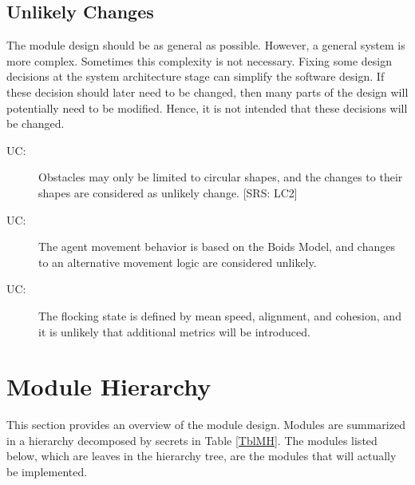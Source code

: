 \documentclass[12pt, titlepage]{article}
\newcounter{ucnum}
\newcommand{\uctheucnum}{UC\theucnum}
\begin{document}
\subsection{Unlikely Changes} \label{SecUchange}

The module design should be as general as possible. However, a general system is
more complex. Sometimes this complexity is not necessary. Fixing some design
decisions at the system architecture stage can simplify the software design. If
these decision should later need to be changed, then many parts of the design
will potentially need to be modified. Hence, it is not intended that these
decisions will be changed.

\begin{description}
\item[ \uctheucnum \label{ucObsShape}:] Obstacles may 
only be limited to circular shapes, and the changes to their shapes are 
considered as unlikely change. [SRS: LC2]
\item[ \uctheucnum \label{ucMoveLogic}:] The agent movement 
behavior is based on the Boids Model, and changes to an alternative movement 
logic are considered unlikely.
\item[ \uctheucnum \label{ucMatrics}:] The flocking state 
is defined by mean speed, alignment, and cohesion, and it is unlikely that 
additional metrics will be introduced.
\end{description}

\section{Module Hierarchy} \label{SecMH}

This section provides an overview of the module design. Modules are summarized
in a hierarchy decomposed by secrets in Table \ref{TblMH}. The modules listed
below, which are leaves in the hierarchy tree, are the modules that will
actually be implemented.
\end{document}
